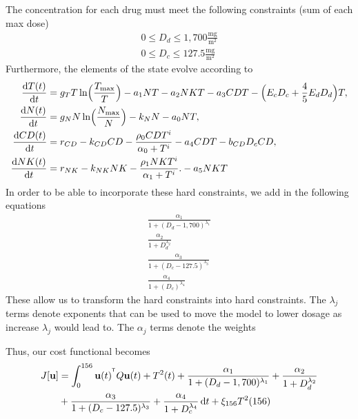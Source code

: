 \documentclass[12pt]{article}
\begin{document}
The concentration for each drug must meet the following constraints (sum of each max dose)
\begin{align*}
	0 \le D_d \le 1,700 \frac{\text{mg}}{\text{m}^2} \\
	0 \le D_c \le 127.5 \frac{\text{mg}}{\text{m}^2}
\end{align*}
Furthermore, the elements of the state evolve according to 
\begin{align*}
	\frac{\diff T(t)}{\diff t} &= g_T T \ln \Bigl( \frac{T_{\max}}{T} \Bigr)- a_1NT - a_2NKT - a_3CDT - \Bigl(E_c D_c +\frac{4}{5}E_d D_d \Bigr)T, \\
	\frac{\diff N(t)}{\diff t} &= g_N N \ln\Bigl(\frac{N_{\max}}{N} \Bigr) - k_N N - a_0NT, \\
	\frac{\diff CD(t)}{\diff t} &= r_{CD} - k_{CD} CD - \frac{\rho_0 CDT ^ i}{\alpha_0 + T^i} - a_4CDT - b_{CD}D_cCD, \\
	\frac{\diff NK(t)}{\diff t} &=r_{NK} - k_{NK} NK - \frac{\rho _1NKT^i}{\alpha_1 + T^i}. - a_5 NK T\\
\end{align*}
In order to be able to incorporate these hard constraints, we add in the following equations
\begin{align*}
	\frac{\alpha_1}{1 + (D_d - 1,700)^{\lambda_1}} \\
	\frac{\alpha_2}{1 + D_d ^{\lambda_2}} \\
	\frac{\alpha_3}{1 + (D_c - 127.5)^{\lambda_3}} \\
	\frac{\alpha_4}{1 + (D_c)^{\lambda_4}}
\end{align*}
These allow us to transform the hard constraints into hard constraints.
The $\lambda_j$ terms denote exponents that can be used to move the model to lower dosage as increase $\lambda_j$ would lead to.
The $\alpha_j$ terms denote the weights

Thus, our cost functional becomes
\begin{align*}
	J[\mathbf{u}] &= \int_0^{156}\mathbf{u}(t)^{^{\mathsf T}} Q \mathbf{u}(t)+ T^2(t) + \frac{\alpha_1}{1 + (D_d - 1,700)^{\lambda_1}} + \frac{\alpha_2}{1 + D_d ^{\lambda_2}} \\
	                    &+ \frac{\alpha_3}{1 + (D_c - 127.5)^{\lambda_3}} + \frac{\alpha_4}{1 + D_c^{\lambda_4}} \mathop{}\!\mathrm{d} t + \xi_{156} T^2(156)
\end{align*}
\end{document}

